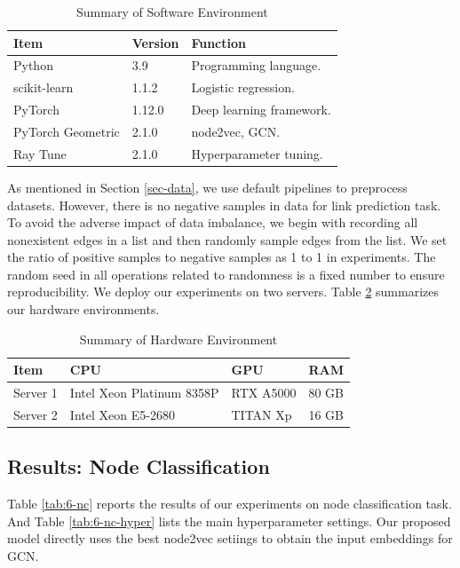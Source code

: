 \documentclass[sigconf]{acmart}
\begin{document}
\begin{table}[!ht]
    \centering
    \caption{Summary of Software Environment}
    \label{tab:6-software}
    \begin{tabular}{lll}
        \toprule
        \textbf{Item} & \textbf{Version} & \textbf{Function}\\
        \midrule
        Python & 3.9 & Programming language.\\
        scikit-learn & 1.1.2 & Logistic regression.\\
        PyTorch & 1.12.0 & Deep learning framework.\\
        PyTorch Geometric & 2.1.0 & node2vec, GCN.\\
        Ray Tune & 2.1.0 & Hyperparameter tuning.\\
        \bottomrule
    \end{tabular}
\end{table}

As mentioned in Section \ref{sec-data}, we use default pipelines to preprocess datasets. However, there is no negative samples in data for link prediction task. To avoid the adverse impact of data imbalance, we begin with recording all nonexistent edges in a list and then randomly sample edges from the list. We set the ratio of positive samples to negative samples as 1 to 1 in experiments. The random seed in all operations related to randomness is a fixed number to ensure reproducibility. We deploy our experiments on two servers. Table \ref{tab:6-hardware} summarizes our hardware environments.

\begin{table}[!ht]
    \centering
    \caption{Summary of Hardware Environment}
    \label{tab:6-hardware}
    \begin{tabular}{llll}
        \toprule
        \textbf{Item} & \textbf{CPU} & \textbf{GPU} & \textbf{RAM}\\
        \midrule
        Server 1 & Intel Xeon Platinum 8358P & RTX A5000 & 80 GB\\
        Server 2 & Intel Xeon E5-2680 & TITAN Xp & 16 GB\\
        \bottomrule
    \end{tabular}
\end{table}

\subsection{Results: Node Classification}
Table \ref{tab:6-nc} reports the results of our experiments on node classification task. And Table \ref{tab:6-nc-hyper} lists the main hyperparameter settings. Our proposed model directly uses the best node2vec setiings to obtain the input embeddings for GCN.
\end{document}
